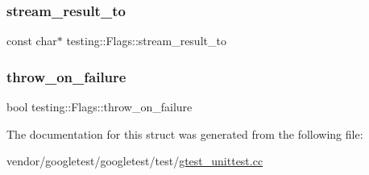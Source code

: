 \subsubsection{\texorpdfstring{stream\+\_\+result\+\_\+to}{stream\_result\_to}}
{\footnotesize\ttfamily const char$\ast$ testing\+::\+Flags\+::stream\+\_\+result\+\_\+to}

\mbox{\label{structtesting_1_1_flags_ab8e7d21e31e641efe47b8050759e001a}} 
\subsubsection{\texorpdfstring{throw\+\_\+on\+\_\+failure}{throw\_on\_failure}}
{\footnotesize\ttfamily bool testing\+::\+Flags\+::throw\+\_\+on\+\_\+failure}



The documentation for this struct was generated from the following file\+:\begin{DoxyCompactItemize}
\item 
vendor/googletest/googletest/test/\hyperlink{gtest__unittest_8cc}{gtest\+\_\+unittest.\+cc}\end{DoxyCompactItemize}
